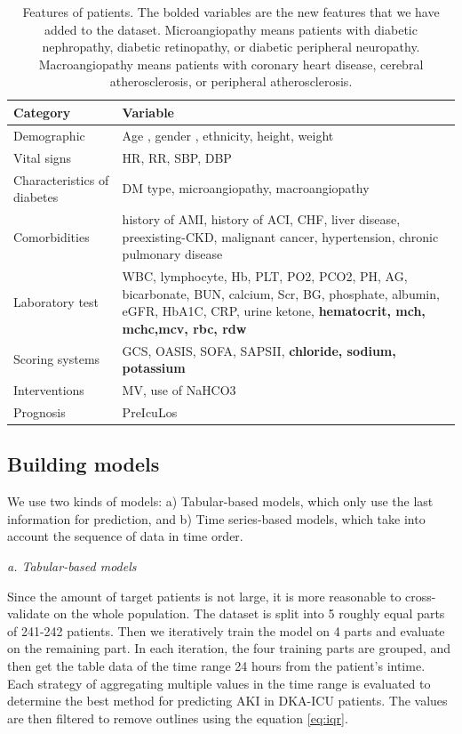 \documentclass[sn-mathphys-num]{sn-jnl}%
\theoremstyle{thmstyleone}%
\theoremstyle{thmstyletwo}%
\theoremstyle{thmstylethree}%
\begin{document}
\begin{table}[h]
\centering
\caption{Features of patients. 
The bolded variables are the new features that we have added to the dataset.
Microangiopathy means patients with diabetic nephropathy, diabetic retinopathy, or diabetic peripheral neuropathy. Macroangiopathy means patients with coronary heart disease, cerebral atherosclerosis, or peripheral atherosclerosis.}
\begin{tabular}{|l|p{}|}
    \hline
    \textbf{Category} & \textbf{Variable} \\ \hline
    Demographic & Age , gender , ethnicity, height, weight \\ \hline
    Vital signs & HR, RR, SBP, DBP \\ \hline
    Characteristics of diabetes & DM type, microangiopathy, macroangiopathy \\ \hline    
    Comorbidities &  history of AMI, history of ACI, CHF, liver disease, preexisting-CKD, malignant cancer, hypertension, chronic pulmonary disease \\ \hline
    Laboratory test &  WBC, lymphocyte, Hb, PLT, PO2, PCO2, PH, AG, bicarbonate, BUN, calcium, Scr, BG, phosphate, albumin, eGFR, HbA1C, CRP, urine ketone, \textbf{hematocrit, mch, mchc,mcv, rbc, rdw} \\ \hline
    Scoring systems &  GCS, OASIS, SOFA, SAPSII, \textbf{chloride, sodium, potassium} \\ \hline
    Interventions &  MV, use of NaHCO3 \\  \hline
    Prognosis &  PreIcuLos \\  \hline
\end{tabular}
\label{tab:features}
\end{table}

\subsection{Building models}
We use two kinds of models: a) Tabular-based models, which only use the last information for prediction, and b) Time series-based models, which take into account the sequence of data in time order. 

\textit{a. Tabular-based models}

Since the amount of target patients is not large, it is more reasonable to cross-validate on the whole population.
The dataset is split into 5 roughly equal parts of 241-242 patients.
Then we iteratively train the model on 4 parts and evaluate on the remaining part.
In each iteration, the four training parts are grouped, and then get the table data of the time range 24 hours from the patient's intime.
Each strategy of aggregating multiple values in the time range is evaluated to determine the best method for predicting AKI in DKA-ICU patients.
The values are then filtered to remove outlines using the equation \ref{eq:iqr}.
\end{document}
